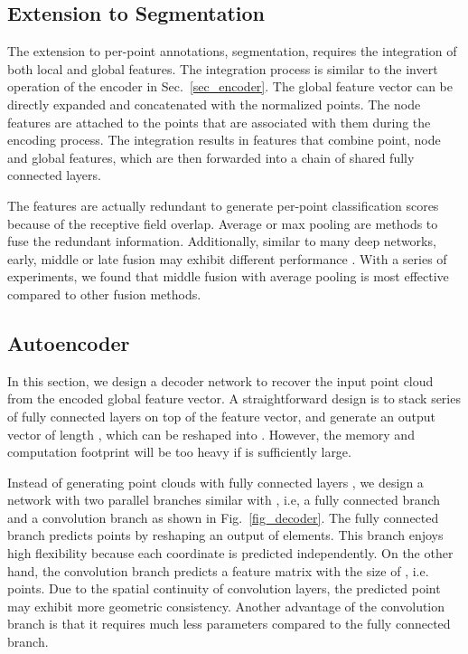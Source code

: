 \documentclass[10pt,twocolumn,letterpaper]{article}
\begin{document}
\subsection{Extension to Segmentation} \label{sec_segmentation}
The extension to per-point annotations, \eg segmentation, requires the integration of both local and global features. The integration process is similar to the invert operation of the encoder in Sec.~\ref{sec_encoder}. The global feature vector can be directly expanded and concatenated with the  normalized points. The  node features are attached to the points that are associated with them during the encoding process. The integration results in  features that combine point, node and global features, which are then forwarded into a chain of shared fully connected layers.

The  features are actually redundant to generate  per-point classification scores 
because of the receptive field overlap. Average or max pooling are methods to fuse the redundant information. Additionally, similar to many deep networks, early, middle or late fusion may exhibit different performance \cite{cheng2017locality}. With a series of experiments, we found that middle fusion with average pooling is most effective compared to other fusion methods. 

\subsection{Autoencoder} \label{sec_autoencoder}

In this section, we design a decoder network to recover the input point cloud from the encoded global feature vector. A straightforward design is to stack series of fully connected layers on top of the feature vector, and generate an output vector of length , which can be reshaped into . However, the memory and computation footprint will be too heavy if  is sufficiently large.

Instead of generating point clouds with fully connected layers \cite{achlioptas2017learning}, we design a network with two parallel branches similar with \cite{fan2016point}, i.e, a fully connected branch and a convolution branch as shown in Fig.~\ref{fig_decoder}. The fully connected branch predicts  points by reshaping an output of  elements. This branch enjoys high flexibility because each coordinate is predicted independently. On the other hand, the convolution branch predicts a feature matrix with the size of , i.e.  points. Due to the spatial continuity of convolution layers, the predicted  point may exhibit more geometric consistency. Another advantage of the convolution branch is that it requires much less parameters compared to the fully connected branch.
\end{document}
